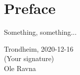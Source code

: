 \section*{Preface}


Something, something... \\[2cm]

\begin{center}
Trondheim, 2020-12-16\\[1pc]
(Your signature)\\[1pc]
Ole Ravna
\end{center}